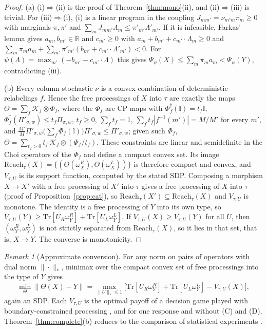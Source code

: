 \documentclass[11pt]{article}
\theoremstyle{definition}
\theoremstyle{remark}
\newtheorem{remark}{Remark}
\newcommand{\Tr}{\mathrm{Tr}}
\newcommand{\one}{\mathbb{I}}
\begin{document}
\begin{proof}
(a) (i)$\Rightarrow$(ii) is the proof of Theorem~\ref{thm:mono}(ii), and (ii)$\Rightarrow$(iii) is trivial. For (iii)$\Rightarrow$(i), (i) is a linear program in the coupling $J_{mm'}=\nu_{m'm}\pi_m\ge0$ with marginals $\pi,\pi'$ and $\sum_mJ_{mm'}\Lambda_m\le\pi'_{m'}\Lambda'_{m'}$. If it is infeasible, Farkas' lemma \cite{Sch86} gives $a_m,b_{m'}\in\mathbb R$ and $c_{m'}\ge0$ with $a_m+b_{m'}+c_{m'}\cdot\Lambda_m\ge0$ and $\sum_m\pi_ma_m+\sum_{m'}\pi'_{m'}(b_{m'}+c_{m'}\cdot\Lambda'_{m'})<0$. For $\psi(\Lambda)=\max_{m'}(-b_{m'}-c_{m'}\cdot\Lambda)$ this gives $\Psi_\psi(X)\le\sum_m\pi_ma_m<\Psi_\psi(Y)$, contradicting (iii).

(b) Every column-stochastic $\nu$ is a convex combination of deterministic relabelings $f$. Hence the free processings of $X$ into $\tau$ are exactly the maps $\Theta=\sum_f\mathcal K_f\otimes\Phi_f$, where the $\Phi_f$ are CP maps with $\Phi_f^\dagger(\one)=t_f\one$, $\Phi_f^\dagger(\Pi'_{\sigma,w})\le t_f\Pi_{\sigma,w}$, $t_f\ge0$, $\sum_ft_f=1$, $\sum_ft_f|f^{-1}(m')|=M/M'$ for every $m'$, and $\frac{M'}{M}\Pi'_{\sigma,w}\bigl(\sum_f\Phi_f(\one)\bigr)\Pi'_{\sigma,w}\le\Pi'_{\sigma,w}$; given such $\Phi_f$, $\Theta=\sum_{t_f>0}t_f\,\mathcal K_f\otimes(\Phi_f/t_f)$. These constraints are linear and semidefinite in the Choi operators of the $\Phi_f$ and define a compact convex set. Its image $\mathrm{Reach}_\tau(X)=\{(\Theta(\omega^R_X),\Theta(\omega^L_X))\}$ is therefore compact and convex, and $V_{\tau,U}$ is its support function, computed by the stated SDP. Composing a morphism $X\to X'$ with a free processing of $X'$ into $\tau$ gives a free processing of $X$ into $\tau$ (proof of Proposition~\ref{prop:cat}), so $\mathrm{Reach}_\tau(X')\subseteq\mathrm{Reach}_\tau(X)$ and $V_{\tau,U}$ is monotone. The identity is a free processing of $Y$ into its own type, so $V_{\tau,U}(Y)\ge\Tr[U_R\omega^R_Y]+\Tr[U_L\omega^L_Y]$. If $V_{\tau,U}(X)\ge V_{\tau,U}(Y)$ for all $U$, then $(\omega^R_Y,\omega^L_Y)$ is not strictly separated from $\mathrm{Reach}_\tau(X)$, so it lies in that set, that is, $X\to Y$. The converse is monotonicity.
\end{proof}

\begin{remark}[Approximate conversion]\label{rem:robust}
For any norm on pairs of operators with dual norm $\|\cdot\|_*$, minimax over the compact convex set of free processings into the type of $Y$ gives
\[
\min_{\Theta}\|\Theta(X)-Y\|=\max_{\|U\|_*\le1}\bigl[\Tr[U_R\omega^R_Y]+\Tr[U_L\omega^L_Y]-V_{\tau,U}(X)\bigr],
\]
again an SDP. Each $V_{\tau,U}$ is the optimal payoff of a decision game played with boundary-constrained processing \cite{TR19,Gour17}, and for one response and without (C) and (D), Theorem~\ref{thm:complete}(b) reduces to the comparison of statistical experiments \cite{Bla53,Bus12}.
\end{remark}
\end{document}

